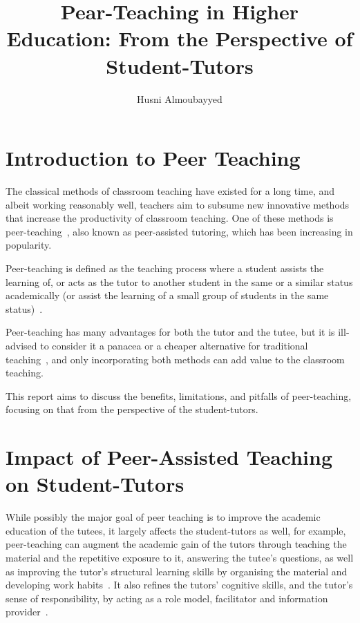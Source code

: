 \documentclass[12pt,helvetica,a4paper,final]{iopart}
\begin{document}
\maketitle

\title[Peer-Teaching in Higher Education]{Pear-Teaching in Higher Education: From the Perspective of Student-Tutors}
\smallskip
\author{Husni Almoubayyed}
\address{School of Physics and Astronomy, University of Glasgow}
\section{Introduction to Peer Teaching}

The classical methods of classroom teaching have existed for a long time, and albeit working reasonably well, teachers aim to subsume new innovative methods that increase the productivity of classroom teaching. One of these methods is peer-teaching~\cite{lausanne}, also known as peer-assisted tutoring, which has been increasing in popularity.


Peer-teaching is defined as the teaching process where a student assists the learning of, or acts as the tutor to another student in the same or a similar status academically (or assist the learning of a small group of students in the same status)~\cite{theory}.

Peer-teaching has many advantages for both the tutor and the tutee, but it is ill-advised to consider it a panacea or a cheaper alternative for traditional teaching~\cite{dundee}, and only incorporating both methods can add value to the classroom teaching.

This report aims to discuss the benefits, limitations, and pitfalls of peer-teaching, focusing on that from the perspective of the student-tutors. 
\section{Impact of Peer-Assisted Teaching on Student-Tutors}

While possibly the major goal of peer teaching is to improve the academic education of the tutees, it largely affects the student-tutors as well, for example, peer-teaching can augment the academic gain of the tutors through teaching the material and the repetitive exposure to it, answering the tutee's questions, as well as improving the tutor's structural learning skills by organising the material and developing work habits~\cite{theory}. It also refines the tutors' cognitive skills, and the tutor's sense of responsibility, by acting as a role model, facilitator and information provider~\cite{medical}.
\end{document}
